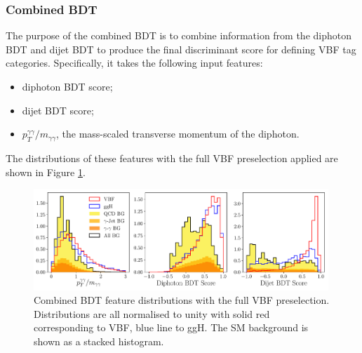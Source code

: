 \subsubsection{Combined BDT}
The purpose of the combined BDT is to combine information from the diphoton BDT and dijet BDT to produce the final discriminant score for defining VBF tag categories. 
Specifically, it takes the following input features:
\begin{itemize}[noitemsep]
    \item diphoton BDT score;
    \item dijet BDT score;
    \item $p_{T}^{\gamma\gamma}/m_{\gamma\gamma}$, the mass-scaled transverse momentum of the diphoton.
\end{itemize}
The distributions of these features with the full VBF preselection applied are shown in Figure \ref{fig:event_categorisaton:combined_bdt_features}.
\begin{figure}[h!]
    \centering
    \includegraphics[width=0.99\textwidth]{figures/event_selection/combined_BDT_features_splitBG_PS.pdf}
    \caption{Combined BDT feature distributions with the full VBF preselection. Distributions are all normalised to unity with solid red corresponding to VBF, blue line to ggH. The SM background is shown as a stacked histogram.}
    \label{fig:event_categorisaton:combined_bdt_features}
\end{figure}

